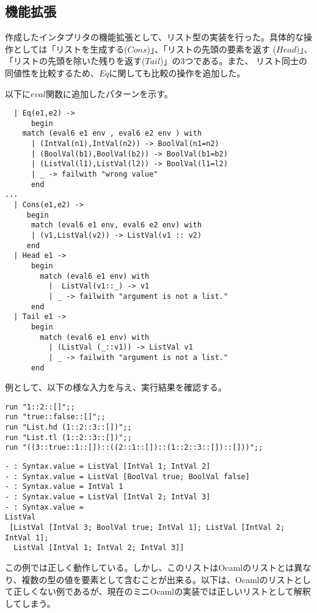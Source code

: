 \documentclass[a4paper,9pt]{jsarticle}
\begin{document}
\subsection{機能拡張}
作成したインタプリタの機能拡張として、リスト型の実装を行った。具体的な操
作としては「リストを生成する($Cons$)」、「リストの先頭の要素を返す
($Head$)」、「リストの先頭を除いた残りを返す($Tail$)」の3つである。また、
リスト同士の同値性を比較するため、$Eq$に関しても比較の操作を追加した。

以下に$eval$関数に追加したパターンを示す。

\begin{lstlisting}
  | Eq(e1,e2) ->
      begin
	match (eval6 e1 env , eval6 e2 env ) with
	  | (IntVal(n1),IntVal(n2)) -> BoolVal(n1=n2)
	  | (BoolVal(b1),BoolVal(b2)) -> BoolVal(b1=b2)
	  | (ListVal(l1),ListVal(l2)) -> BoolVal(l1=l2)
	  | _ -> failwith "wrong value"
      end
...
  | Cons(e1,e2) ->
     begin
      match (eval6 e1 env, eval6 e2 env) with
      | (v1,ListVal(v2)) -> ListVal(v1 :: v2)
     end
  | Head e1 ->
      begin
        match (eval6 e1 env) with
          |  ListVal(v1::_) -> v1
          | _ -> failwith "argument is not a list."
      end     
  | Tail e1 ->
      begin
        match (eval6 e1 env) with
          | (ListVal (_::v1)) -> ListVal v1
          | _ -> failwith "argument is not a list."
      end
\end{lstlisting}

例として、以下の様な入力を与え、実行結果を確認する。

\begin{lstlisting}
run "1::2::[]";;
run "true::false::[]";;
run "List.hd (1::2::3::[])";;
run "List.tl (1::2::3::[])";;
run "((3::true::1::[])::((2::1::[])::(1::2::3::[])::[]))";;
\end{lstlisting}

\begin{lstlisting}
- : Syntax.value = ListVal [IntVal 1; IntVal 2]
- : Syntax.value = ListVal [BoolVal true; BoolVal false]
- : Syntax.value = IntVal 1
- : Syntax.value = ListVal [IntVal 2; IntVal 3]
- : Syntax.value =
ListVal
 [ListVal [IntVal 3; BoolVal true; IntVal 1]; ListVal [IntVal 2; IntVal 1];
  ListVal [IntVal 1; IntVal 2; IntVal 3]]
\end{lstlisting}

この例では正しく動作している。しかし、このリストはOcamlのリストとは異な
り、複数の型の値を要素として含むことが出来る。以下は、Ocamlのリストとし
て正しくない例であるが、現在のミニOcamlの実装では正しいリストとして解釈
してしまう。
\end{document}
